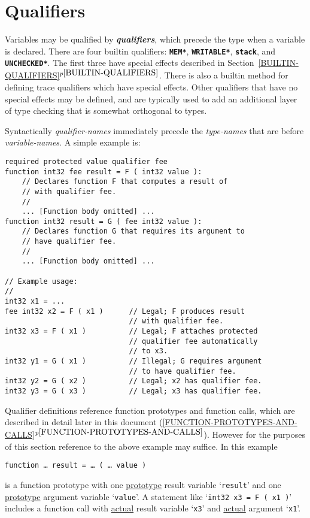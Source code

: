 \documentclass[12pt]{article}
\newcommand{\TT}[1]{{\tt \bfseries #1}}
\newcommand{\skey}[2]{{\bf \em #1#2}\index{#1}}
\newcommand{\itemref}[1]{\ref{#1}$^{p\pageref{#1}}$}
\newenvironment{indpar}[1][0.3in]%
	{\begin{list}{}%
		     {\setlength{\itemsep}{0in}%
		      \setlength{\topsep}{0in}%
		      \setlength{\parsep}{1ex}%
		      \setlength{\labelwidth}{#1}%
		      \setlength{\leftmargin}{#1}%
		      \addtolength{\leftmargin}{\labelsep}}%
	 \item}%
	{\end{list}}
\begin{document}
\section{Qualifiers}
\label{QUALIFIERS}

Variables may be qualified by \skey{qualifier}s, which precede the
type when a variable is declared.  There are four builtin qualifiers:
\TT{*MEM*}, \TT{*WRITABLE*}, \TT{stack}, and \TT{*UNCHECKED*}.
The first three have special effects
described in Section~\itemref{BUILTIN-QUALIFIERS}.
There is also a builtin method for defining trace qualifiers which
have special effects.
Other qualifiers that have no special effects
may be defined, and are typically used to add an
additional layer of type checking that is somewhat orthogonal to
types.

Syntactically {\em qualifier-names} immediately precede the {\em type-names}
that are before {\em variable-names}.  A simple example is:
\begin{indpar}\begin{verbatim}
required protected value qualifier fee
function int32 fee result = F ( int32 value ):
    // Declares function F that computes a result of
    // with qualifier fee.
    //
    ... [Function body omitted] ...
function int32 result = G ( fee int32 value ):
    // Declares function G that requires its argument to
    // have qualifier fee.
    //
    ... [Function body omitted] ...

// Example usage:
//
int32 x1 = ...
fee int32 x2 = F ( x1 )      // Legal; F produces result
                             // with qualifier fee.
int32 x3 = F ( x1 )          // Legal; F attaches protected
                             // qualifier fee automatically
                             // to x3.
int32 y1 = G ( x1 )          // Illegal; G requires argument
                             // to have qualifier fee.
int32 y2 = G ( x2 )          // Legal; x2 has qualifier fee.
int32 y3 = G ( x3 )          // Legal; x3 has qualifier fee.

\end{verbatim}\end{indpar}

Qualifier definitions reference function prototypes and function
calls, which are described in detail later in this document
(\itemref{FUNCTION-PROTOTYPES-AND-CALLS}).  However for the
purposes of this section reference to the above example may suffice.
In this example
\begin{center}
{\tt function \ldots{} result = \ldots{} ( \ldots{} value )}
\end{center}
is a function prototype with one \underline{prototype} result variable
`{\tt result}' and one \underline{prototype} argument variable `{\tt value}'.
A statement like `{\tt int32 x3 = F ( x1 )}' includes a function
call with \underline{actual} result variable `{\tt x3}' and
\underline{actual} argument `{\tt x1}'.
\end{document}
